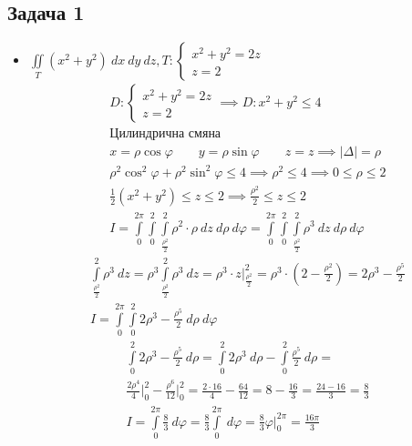 \documentclass[a4paper,fleqn,12pt]{article}
\theoremstyle{definition}
\begin{document}
\subsection*{Задача 1}
\begin{itemize}
\item $\iint\limits_{T} (x^2 + y^2 ) \ dx \ dy \ dz, 
T: \begin{cases} x^2 + y^2 = 2z \\ z = 2 \end{cases}$ \\
\begin{gather*}
D: \begin{cases} x^2 + y^2 = 2z \\ z = 2 \end{cases} \implies D: x^2 +y^2 \leq 4 \\
\text{Цилиндрична смяна} \\
x = \rho \cos \varphi \qquad y = \rho \sin \varphi \qquad z = z  \implies |\Delta| = \rho \\
\rho^2 \cos^2 \varphi + \rho^2 \sin^2 \varphi \leq 4 \implies \rho^2 \leq 4 \implies 0 \leq \rho \leq 2 \\
\frac{1}{2} (x^2 + y^2) \leq z \leq 2 \implies \frac{\rho^2}{2} \leq z \leq 2 \\
I = \int\limits_0 ^{2\pi} \int\limits_0 ^2 \int\limits_{\frac{\rho^2}{2}} ^2 \rho^2 \cdot \rho \ dz \ d \rho \ d \varphi =
\int\limits_0 ^{2\pi} \int\limits_0 ^2 \int\limits_{\frac{\rho^2}{2}} ^2 \rho^3 \ dz \ d \rho \ d \varphi
\end{gather*}
\begin{gather*}
\int\limits_{\frac{\rho^2}{2}} ^2 \rho^3 \ dz = 
\rho^3 \int\limits_{\frac{\rho^2}{2}} ^2 \rho^3 \ dz = 
\rho^3 \cdot z \Big|_{\frac{\rho^2}{2}} ^2 = 
\rho^3  \cdot \left( 2 - \frac{\rho^2}{2} \right) = 2\rho^3 - \frac{\rho^5}{2} \\
I = \int\limits_0 ^{2\pi} \int\limits_0 ^2 2\rho^3 - \frac{\rho^5}{2} \ d \rho \ d \varphi 
\end{gather*}
\begin{gather*}
\int\limits_0 ^2 2\rho^3 - \frac{\rho^5}{2} \ d \rho = 
\int\limits_0 ^2 2\rho^3 \ d \rho - \int\limits_0 ^2 \frac{\rho^5}{2} \ d \rho = \\
\frac{2\rho^4}{4} \Big|_0 ^2 - \frac{\rho^6}{12} \Big|_0 ^2 = 
\frac{2 \cdot 16}{4} - \frac{64}{12} =  8 - \frac{16}{3} = \frac{24 - 16}{3} = \frac{8}{3} \\
I = \int\limits_0 ^{2\pi}  \frac{8}{3} \ d \varphi  =  
\frac{8}{3} \int\limits_0 ^{2\pi} \ d \varphi = 
\frac{8}{3} \varphi \Big|_0 ^{2\pi} = \frac{16 \pi}{3}
\end{gather*}


\end{itemize}
\end{document}
